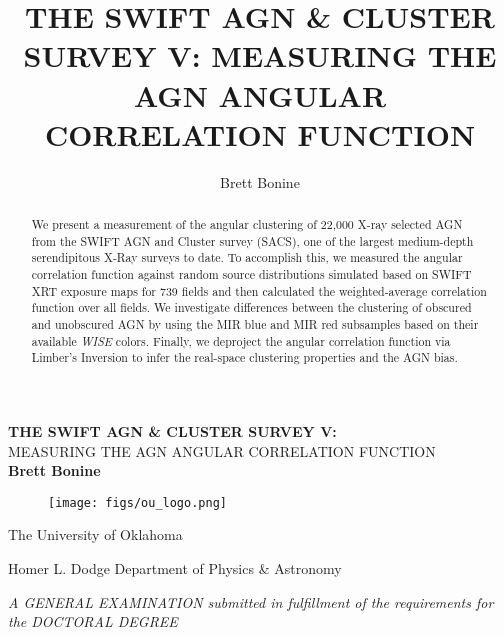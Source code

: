 \documentclass[preprint]{aastex63}
\begin{document}
\title{THE SWIFT AGN \& CLUSTER SURVEY V: MEASURING THE AGN ANGULAR CORRELATION FUNCTION}
\author{Brett Bonine}

\begin{abstract} 
    We present a measurement of the angular clustering of 22,000 X-ray selected AGN from the SWIFT AGN and Cluster survey (SACS),
    one of the largest medium-depth serendipitous X-Ray surveys to date. 
    To accomplish this, we measured the angular correlation function against random source distributions simulated based on SWIFT XRT exposure maps for 739 fields and then calculated the weighted-average correlation function
    over all fields. We investigate differences between the clustering of obscured and unobscured AGN by 
    using the  MIR blue and MIR red subsamples based on their available \textit{WISE} colors. Finally, we deproject the angular correlation function 
    via Limber's Inversion to infer the real-space clustering properties and the AGN bias.
\end{abstract}

\begin{titlepage}
\center
\Large{\textbf{THE SWIFT AGN \& CLUSTER SURVEY V:}} \\
MEASURING THE AGN ANGULAR CORRELATION FUNCTION \\
\bigskip
\bigskip
\bigskip
\bigskip
\Large{\textbf{Brett Bonine}}

\vfill
\begin{figure}[!h]
    
    \centering
    \texttt{[image: figs/ou\_logo.png]}
    
\end{figure}

\vfill
The University of Oklahoma

Homer L. Dodge Department of Physics \& Astronomy

\vfill

\textit{A GENERAL EXAMINATION submitted in fulfillment of the requirements for the DOCTORAL DEGREE}
\end{titlepage}

\newpage
\setcounter{page}{1}
\end{document}
